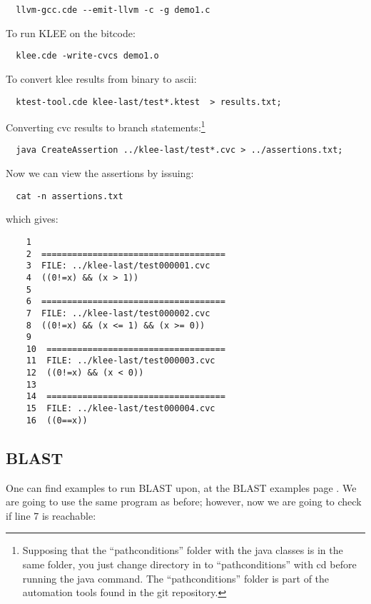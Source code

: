 \documentclass[a4paper, 11pt,twoside]{article}
\begin{document}
\begin{verbatim} 
  llvm-gcc.cde --emit-llvm -c -g demo1.c
\end{verbatim}

To run KLEE on the bitcode:

\begin{verbatim} 
  klee.cde -write-cvcs demo1.o
\end{verbatim}

To convert klee results from binary to ascii:

\begin{verbatim} 
  ktest-tool.cde klee-last/test*.ktest  > results.txt;
\end{verbatim}

Converting cvc results to branch statements:\footnote{Supposing that the ``pathconditions'' folder with the java classes is in the same folder, you just change directory in to ``pathconditions'' with cd before running the java command. The ``pathconditions'' folder is part of the automation tools found in the git repository.}

\begin{verbatim} 
  java CreateAssertion ../klee-last/test*.cvc > ../assertions.txt;
\end{verbatim}

Now we can view the assertions by issuing:

\begin{verbatim} 
  cat -n assertions.txt
\end{verbatim}

which gives:

\begin{verbatim} 
 	1  
 	2  ====================================
 	3  FILE: ../klee-last/test000001.cvc
 	4  ((0!=x) && (x > 1))
 	5  
 	6  ====================================
 	7  FILE: ../klee-last/test000002.cvc
 	8  ((0!=x) && (x <= 1) && (x >= 0))
 	9  
	10  ===================================
	11  FILE: ../klee-last/test000003.cvc
	12  ((0!=x) && (x < 0))
	13  
	14  ===================================
	15  FILE: ../klee-last/test000004.cvc
	16  ((0==x))
\end{verbatim}

\subsection{BLAST}
One can find examples to run BLAST upon, at the BLAST examples page \cite{BlaEx}. We are going to use the same program as before; however, now we are going to check if line 7 is reachable:
\end{document}
